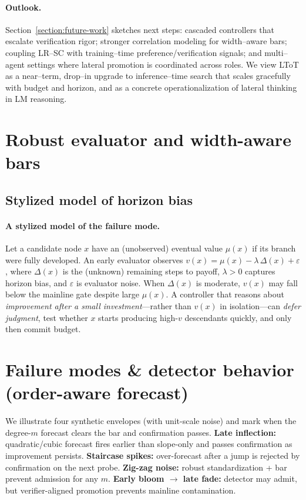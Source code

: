 \documentclass{article}
\begin{document}
\paragraph{Outlook.}
Section~\ref{section:future-work} sketches next steps: cascaded controllers that escalate verification rigor; stronger correlation modeling for width--aware bars; coupling LR--SC with training--time preference/verification signals; and multi--agent settings where lateral promotion is coordinated across roles.
We view LToT as a near--term, drop--in upgrade to inference--time search that scales gracefully with budget and horizon, and as a concrete operationalization of lateral thinking in LM reasoning.



\appendix

\section{Robust evaluator and width-aware bars}

\subsection{Stylized model of horizon bias}
\paragraph{A stylized model of the failure mode.}
Let a candidate node $x$ have an (unobserved) eventual value $\mu(x)$ if its branch were fully developed.
An early evaluator observes $v(x) = \mu(x) - \lambda \,\Delta(x) + \varepsilon$, where $\Delta(x)$ is the (unknown) remaining steps to payoff, $\lambda>0$ captures horizon bias, and $\varepsilon$ is evaluator noise.
When $\Delta(x)$ is moderate, $v(x)$ may fall below the mainline gate despite large $\mu(x)$.
A controller that reasons about \emph{improvement after a small investment}—rather than $v(x)$ in isolation—can \emph{defer judgment}, test whether $x$ starts producing high-$v$ descendants quickly, and only then commit budget.
\label{app:robust-eval}
\section{Failure modes \& detector behavior (order-aware forecast)}
We illustrate four synthetic envelopes (with unit-scale noise) and mark when the degree-$m$ forecast clears the bar and confirmation passes.
\textbf{Late inflection:} quadratic/cubic forecast fires earlier than slope-only and passes confirmation as improvement persists.
\textbf{Staircase spikes:} over-forecast after a jump is rejected by confirmation on the next probe.
\textbf{Zig-zag noise:} robust standardization + bar prevent admission for any $m$.
\textbf{Early bloom $\to$ late fade:} detector may admit, but verifier-aligned promotion prevents mainline contamination.
\end{document}
